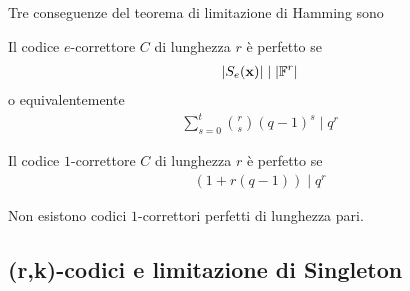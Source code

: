 Tre conseguenze del teorema di limitazione di Hamming sono
\begin{corollario}
    Il codice $e$-correttore $C$ di lunghezza $r$ è perfetto se
    \begin{align*}
        \arrowvert S_{e}(\mathbf{x})  \arrowvert \mid  \arrowvert \mathbb{F}^{r} \arrowvert
     \end{align*}
     o equivalentemente
     \begin{align*}
         \sum_{s=0}^{t} \binom{r}{s}(q-1)^{s} \mid q^r
     \end{align*}
\end{corollario}

\begin{corollario}
    Il codice $1$-correttore $C$ di lunghezza $r$ è perfetto se
     \begin{align*}
         (1+r(q-1)) \mid q^r
     \end{align*}
\end{corollario}

\begin{corollario}
    Non esistono codici $1$-correttori perfetti di lunghezza pari.
\end{corollario}

\subsection{(r,k)-codici e limitazione di Singleton}

